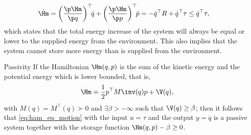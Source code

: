 \begin{align}
\dot{\Hm} & = \left(\frac{\p \Hm}{\p q}\right)^\top \!\! \dot{q} + \left(\frac{\p \Hm}{\p p}\right)^\top \!\!\dot{p} = -\dot{q}^\top R + \dot{q}^\top \tau \le \dot{q}^\top \tau,
\end{align}
which states that the total energy increase of the system will always be equal or lower to the supplied energy from the environment. This also implies that the system cannot store more energy than is supplied from the environment.
\begin{prop}{Passivity}
If the Hamiltonian $\Hm(q,p)$ is the sum of the kinetic energy and the potential energy which is lower bounded, that is, 
\begin{equation}
\Hm = \frac{1}{2} p^\top M\inv(q) p + \V(q),
\end{equation}
with $M(q) = M^\top(q) \succ 0$ and $\exists \beta > -\infty$ such that $\V(q) \ge \beta$; then it follows that \eqref{eq:ham_eq_motion} with the input $u = \tau$ and the output $y = \dot{q}$ is a passive system together with the storage function $\Hm(q,p) - \beta \ge 0$. 
\end{prop}